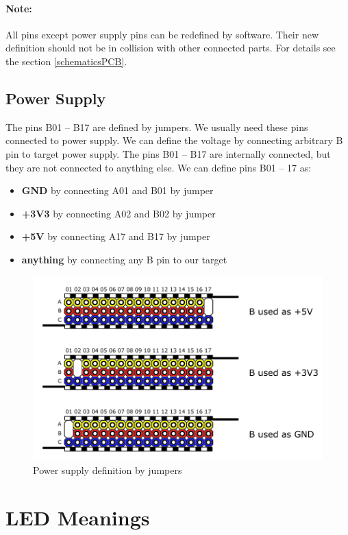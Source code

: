 \paragraph{Note:} All pins except power supply pins can be redefined by software. Their new definition should not be in collision with other connected parts. For details see the section \ref{schematicsPCB}.

\subsection{Power Supply}
\label{jumpersExternalPins}
The pins B01 -- B17 are defined by jumpers. We usually need these pins connected to power supply. We can define the voltage by connecting arbitrary B pin to target power supply. The pins B01 -- B17 are internally connected, but they are not connected to anything else. We can define pins B01 -- 17 as:
\begin{itemize}
	\setlength\itemsep{0.2em}
	\item \textbf{GND} by connecting A01 and B01 by jumper
	\item \textbf{+3V3} by connecting A02 and B02 by jumper
	\item \textbf{+5V} by connecting A17 and B17 by jumper
	\item \textbf{anything} by connecting any B pin to our target
\end{itemize}

\begin{figure}[H]
	\centering
	\includegraphics[scale=1]{img/jumpers.pdf}
	\caption{Power supply definition by jumpers}
	\label{fig:jumpersSupply}
\end{figure}

\section{LED Meanings}

